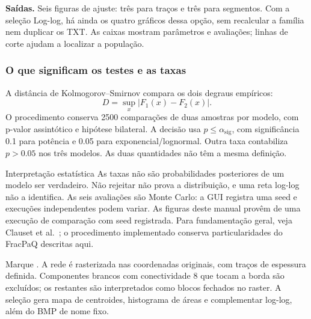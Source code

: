 \textbf{Saídas.} Seis figuras de ajuste: três para traços e três para segmentos. Com a seleção Log-log, há ainda os quatro gráficos dessa opção, sem recalcular a família nem duplicar os TXT. As caixas mostram parâmetros e avaliações; linhas de corte ajudam a localizar a população.

\subsubsection{O que significam os testes e as taxas}
A distância de Kolmogorov--Smirnov compara os dois degraus empíricos:
\begin{equation}D=\sup_x|F_1(x)-F_2(x)|.\end{equation}
O procedimento conserva 2500 comparações de duas amostras por modelo, com p-valor assintótico e hipótese bilateral. A decisão usa \(p\leq\alpha_{\mathrm{sig}}\), com significância 0.1 para potência e 0.05 para exponencial/lognormal. Outra taxa contabiliza \(p>0.05\) nos três modelos. As duas quantidades não têm a mesma definição.

\begin{note}{Interpretação estatística}
As taxas não são probabilidades posteriores de um modelo ser verdadeiro. Não rejeitar não prova a distribuição, e uma reta log-log não a identifica. As seis avaliações são Monte Carlo: a GUI registra uma seed e execuções independentes podem variar. As figuras deste manual provêm de uma execução de comparação com seed registrada. Para fundamentação geral, veja Clauset et al.~\cite{clauset}; o procedimento implementado conserva particularidades do FracPaQ descritas aqui.
\end{note}

Marque . A rede é rasterizada nas coordenadas originais, com traços de espessura definida. Componentes brancos com conectividade 8 que tocam a borda são excluídos; os restantes são interpretados como blocos fechados no raster. A seleção gera mapa de centroides, histograma de áreas e complementar log-log, além do BMP de nome fixo.

